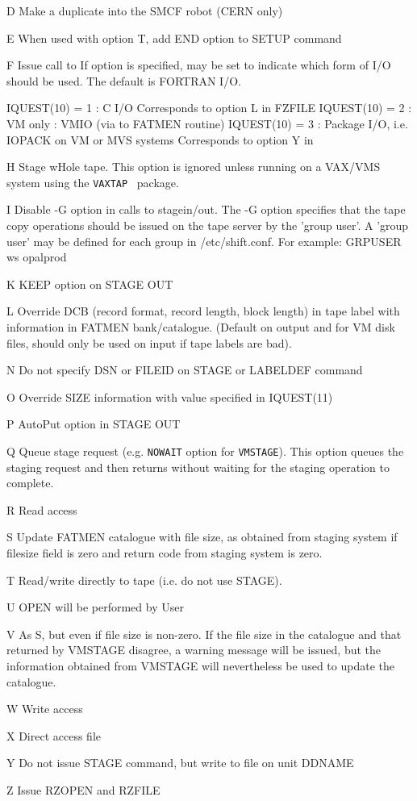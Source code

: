 \begin{DLtt}{12}
\item[D]Make a duplicate into the SMCF robot (CERN only)
\item[E]When used with option T, add END option to SETUP command
\item[F]Issue call to 
If option  is specified,  may be set to indicate 
which form of I/O should be used. The default is FORTRAN I/O.
\begin{XMP}
IQUEST(10) = 1 : C I/O
                 Corresponds to option L in FZFILE
IQUEST(10) = 2 : VM only : VMIO
                 (via  to FATMEN routine)
IQUEST(10) = 3 : Package I/O, i.e. IOPACK on VM or MVS systems
                 Corresponds to option Y in 
\end{XMP}
\item[H]Stage wHole tape. This option is ignored unless running 
on a VAX/VMS system using the {\tt VAXTAP}~\cite{bib-VAXTAP}
package.
\item[I]Disable -G option in calls to stagein/out.
        The -G option specifies that the tape copy operations should be
              issued on the tape server by the  'group  user'.  A
              'group  user'  may  be  defined  for  each group in
              /etc/shift.conf.  For example: GRPUSER ws     opalprod
\item[K]KEEP option on STAGE OUT
\item[L]Override DCB (record format, record length, block length)
in tape label with information in FATMEN bank/catalogue.
(Default on output and for VM disk files, should only be used
on input if tape labels are bad).
\item[N]Do not specify DSN or FILEID on STAGE or LABELDEF command
\item[O]Override SIZE information with value specified in IQUEST(11)
\item[P]AutoPut option in STAGE OUT
\item[Q]Queue stage request (e.g. {\tt NOWAIT} option for {\tt VMSTAGE}).
This option queues the staging request and then returns
without waiting for the staging operation to complete. 
\item[R]Read access
\item[S]Update FATMEN catalogue with file size, as obtained from staging system
if filesize field is zero and return code from staging system is zero.
\item[T]Read/write directly to tape (i.e. do not use STAGE).
\item[U]OPEN will be performed by User
\item[V]As S, but even if file size is non-zero. If the file size
in the catalogue and that returned by VMSTAGE disagree, a warning
message will be issued, but the information obtained from VMSTAGE
will nevertheless be used to update the catalogue.
\item[W]Write access
\item[X]Direct access file
\item[Y]Do not issue STAGE command, but write to file on unit DDNAME
\item[Z]Issue RZOPEN and RZFILE
\end{DLtt}
